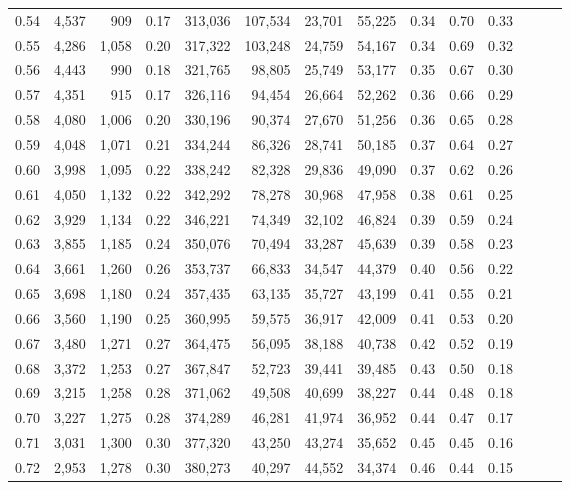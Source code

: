 \begin{tabular}{rrrrrrrrrrrrrr}
0.54 &  4,537 &    909 &  0.17 &  313,036 &  107,534 &  23,701 &  55,225 &  0.34 &  0.70 &      0.33 \\
0.55 &  4,286 &  1,058 &  0.20 &  317,322 &  103,248 &  24,759 &  54,167 &  0.34 &  0.69 &      0.32 \\
0.56 &  4,443 &    990 &  0.18 &  321,765 &   98,805 &  25,749 &  53,177 &  0.35 &  0.67 &      0.30 \\
0.57 &  4,351 &    915 &  0.17 &  326,116 &   94,454 &  26,664 &  52,262 &  0.36 &  0.66 &      0.29 \\
0.58 &  4,080 &  1,006 &  0.20 &  330,196 &   90,374 &  27,670 &  51,256 &  0.36 &  0.65 &      0.28 \\
0.59 &  4,048 &  1,071 &  0.21 &  334,244 &   86,326 &  28,741 &  50,185 &  0.37 &  0.64 &      0.27 \\
0.60 &  3,998 &  1,095 &  0.22 &  338,242 &   82,328 &  29,836 &  49,090 &  0.37 &  0.62 &      0.26 \\
0.61 &  4,050 &  1,132 &  0.22 &  342,292 &   78,278 &  30,968 &  47,958 &  0.38 &  0.61 &      0.25 \\
0.62 &  3,929 &  1,134 &  0.22 &  346,221 &   74,349 &  32,102 &  46,824 &  0.39 &  0.59 &      0.24 \\
0.63 &  3,855 &  1,185 &  0.24 &  350,076 &   70,494 &  33,287 &  45,639 &  0.39 &  0.58 &      0.23 \\
0.64 &  3,661 &  1,260 &  0.26 &  353,737 &   66,833 &  34,547 &  44,379 &  0.40 &  0.56 &      0.22 \\
0.65 &  3,698 &  1,180 &  0.24 &  357,435 &   63,135 &  35,727 &  43,199 &  0.41 &  0.55 &      0.21 \\
0.66 &  3,560 &  1,190 &  0.25 &  360,995 &   59,575 &  36,917 &  42,009 &  0.41 &  0.53 &      0.20 \\
0.67 &  3,480 &  1,271 &  0.27 &  364,475 &   56,095 &  38,188 &  40,738 &  0.42 &  0.52 &      0.19 \\
0.68 &  3,372 &  1,253 &  0.27 &  367,847 &   52,723 &  39,441 &  39,485 &  0.43 &  0.50 &      0.18 \\
0.69 &  3,215 &  1,258 &  0.28 &  371,062 &   49,508 &  40,699 &  38,227 &  0.44 &  0.48 &      0.18 \\
0.70 &  3,227 &  1,275 &  0.28 &  374,289 &   46,281 &  41,974 &  36,952 &  0.44 &  0.47 &      0.17 \\
0.71 &  3,031 &  1,300 &  0.30 &  377,320 &   43,250 &  43,274 &  35,652 &  0.45 &  0.45 &      0.16 \\
0.72 &  2,953 &  1,278 &  0.30 &  380,273 &   40,297 &  44,552 &  34,374 &  0.46 &  0.44 &      0.15 \\

\end{tabular}
